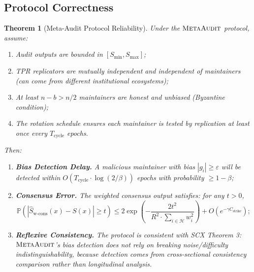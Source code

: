 \documentclass[11pt,a4paper]{article}
\newtheorem{theorem}{Theorem}[section]
\theoremstyle{definition}
\newcommand{\Prob}{\mathbb{P}}
\newcommand{\MetaAudit}{\textsc{MetaAudit}}
\begin{document}
\subsection{Protocol Correctness}

\begin{theorem}[Meta-Audit Protocol Reliability]
\label{thm:protocol_reliability}
Under the $\MetaAudit$ protocol, assume:
\begin{enumerate}[label=(H\arabic*), leftmargin=*]
    \item Audit outputs are bounded in $[S_{\min}, S_{\max}]$;
    \item TPR replicators are mutually independent and independent of maintainers (can come from different institutional ecosystems);
    \item At least $n-b > n/2$ maintainers are honest and unbiased (Byzantine condition);
    \item The rotation schedule ensures each maintainer is tested by replication at least once every $T_{\text{cycle}}$ epochs.
\end{enumerate}
Then:
\begin{enumerate}[label=(\alph*), leftmargin=*]
    \item \textbf{Bias Detection Delay.} A malicious maintainer with bias $|g_i| \geq \varepsilon$ will be detected within $O(T_{\text{cycle}} \cdot \log(2/\beta))$ epochs with probability $\geq 1-\beta$;
    \item \textbf{Consensus Error.} The weighted consensus output satisfies: for any $t > 0$,
    \begin{equation*}
        \Prob(|\hat{S}_{\text{w-cons}}(x) - S(x)| \geq t) \leq 2\exp\left(-\frac{2t^2}{R^2 \cdot \sum_{i \in \mathcal{H}} w_i^2}\right) + O(e^{-\gamma C_{\text{strike}}});
    \end{equation*}
    \item \textbf{Reflexive Consistency.} The protocol is consistent with SCX Theorem 3: $\MetaAudit$'s bias detection does not rely on breaking noise/difficulty indistinguishability, because detection comes from cross-sectional consistency comparison rather than longitudinal analysis.
\end{enumerate}
\end{theorem}
\end{document}
